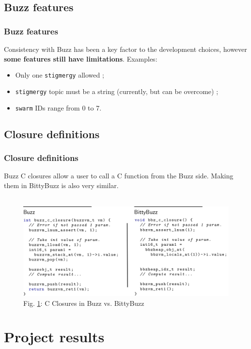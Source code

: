 \documentclass{beamer}
\begin{document}
	\subsection{Buzz features}
	\begin{frame}
		\frametitle{Buzz features}
		Consistency with Buzz has been a key factor to the development choices, however \textbf{some features still have limitations}. Examples:
		\begin{itemize}
			\item Only one \texttt{stigmergy} allowed ;
			\item \texttt{stigmergy} topic must be a string (currently, but can be overcome) ;
			\item \texttt{swarm} IDs range from 0 to 7.
		\end{itemize}
	\end{frame}
	\textsl{\textsl{}}\subsection{Closure definitions}
	\begin{frame}
		\frametitle{Closure definitions}
		Buzz C closures allow a user to call a C function from the Buzz side. Making them in BittyBuzz is also very similar.\\
		~\\
		\begin{figure}
			\includegraphics[width=1\textwidth]{ClosureDefinitions}
			\caption{\label{figure:C Closures}Fig. \ref{figure:C Closures}: C Closures in Buzz vs. BittyBuzz}
		\end{figure}
	\end{frame}
	\section{Project results}
\end{document}

